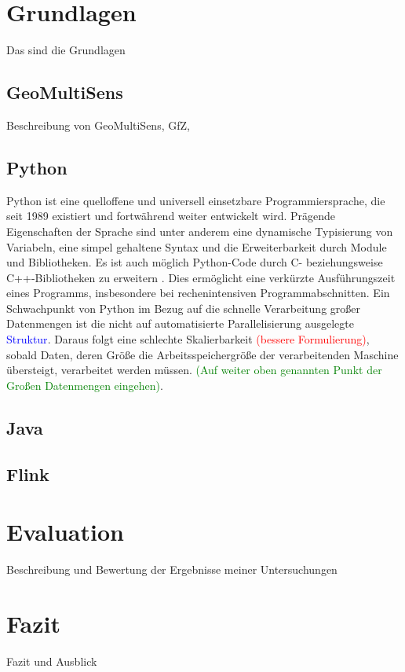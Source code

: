 \chapter{Grundlagen}
Das sind die Grundlagen

\section{GeoMultiSens}
Beschreibung von GeoMultiSens, GfZ, 

\section{Python}
Python ist eine quelloffene und universell einsetzbare Programmiersprache, die seit 1989 existiert und fortwährend weiter entwickelt wird. Prägende Eigenschaften der Sprache sind unter anderem eine dynamische Typisierung von Variabeln, eine simpel gehaltene Syntax und die Erweiterbarkeit durch Module und Bibliotheken. Es ist auch möglich Python-Code durch C- beziehungsweise C++-Bibliotheken zu erweitern \cite{Martelli2006}. Dies ermöglicht eine verkürzte Ausführungszeit eines Programms, insbesondere bei rechenintensiven Programmabschnitten. Ein Schwachpunkt von Python im Bezug auf die schnelle Verarbeitung großer Datenmengen ist die nicht auf automatisierte Parallelisierung ausgelegte \textcolor{blue}{Struktur}. Daraus folgt eine schlechte Skalierbarkeit \textcolor{red}{(bessere Formulierung)}, sobald Daten, deren Größe die Arbeitsspeichergröße der verarbeitenden Maschine übersteigt, verarbeitet werden müssen. \textcolor{green}{(Auf weiter oben genannten Punkt der Großen Datenmengen eingehen)}.

\section{Java}

\section{Flink}

\chapter{Evaluation}
Beschreibung und Bewertung der Ergebnisse meiner Untersuchungen

\chapter{Fazit}
Fazit und Ausblick

